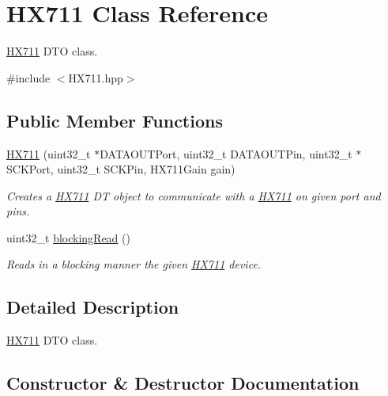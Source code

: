 \hypertarget{class_h_x711}{}\section{H\+X711 Class Reference}
\label{class_h_x711}


\hyperlink{class_h_x711}{H\+X711} D\+TO class.  




{\ttfamily \#include $<$H\+X711.\+hpp$>$}

\subsection*{Public Member Functions}
\begin{DoxyCompactItemize}
\item 
\hyperlink{class_h_x711_a4811851fedcc143ef8c5a167bf6d0a27}{H\+X711} (uint32\+\_\+t $\ast$D\+A\+T\+A\+O\+U\+T\+Port, uint32\+\_\+t D\+A\+T\+A\+O\+U\+T\+Pin, uint32\+\_\+t $\ast$S\+C\+K\+Port, uint32\+\_\+t S\+C\+K\+Pin, H\+X711\+Gain gain)
\begin{DoxyCompactList}\small\item\em Creates a \hyperlink{class_h_x711}{H\+X711} DT object to communicate with a \hyperlink{class_h_x711}{H\+X711} on given port and pins. \end{DoxyCompactList}\item 
uint32\+\_\+t \hyperlink{class_h_x711_ac449a6f2a029151474312b0bcffd12a0}{blocking\+Read} ()
\begin{DoxyCompactList}\small\item\em Reads in a blocking manner the given \hyperlink{class_h_x711}{H\+X711} device. \end{DoxyCompactList}\end{DoxyCompactItemize}


\subsection{Detailed Description}
\hyperlink{class_h_x711}{H\+X711} D\+TO class. 

\subsection{Constructor \& Destructor Documentation}
\mbox{\label{class_h_x711_a4811851fedcc143ef8c5a167bf6d0a27}} 
